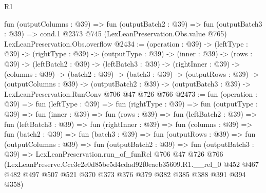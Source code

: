 \begin{lexlean}{R1}
\begin{coremodule}
  fun (outputColumns : @39) =>
  fun (outputBatch2 : @39) =>
  fun (outputBatch3 : @39) =>
  cond.{1} @2373 @745 (LexLeanPreservation.Obs.value @765) LexLeanPreservation.Obs.overflow
@2434 := (operation : @39) ->
  (leftType : @39) ->
  (rightType : @39) ->
  (outputType : @39) ->
  (inner : @39) ->
  (rows : @39) ->
  (leftBatch2 : @39) ->
  (leftBatch3 : @39) ->
  (rightInner : @39) ->
  (columns : @39) ->
  (batch2 : @39) ->
  (batch3 : @39) ->
  (outputRows : @39) ->
  (outputColumns : @39) ->
  (outputBatch2 : @39) -> (outputBatch3 : @39) -> LexLeanPreservation.RunConv @706 @47 @726 @766
@2473 := fun (operation : @39) =>
  fun (leftType : @39) =>
  fun (rightType : @39) =>
  fun (outputType : @39) =>
  fun (inner : @39) =>
  fun (rows : @39) =>
  fun (leftBatch2 : @39) =>
  fun (leftBatch3 : @39) =>
  fun (rightInner : @39) =>
  fun (columns : @39) =>
  fun (batch2 : @39) =>
  fun (batch3 : @39) =>
  fun (outputRows : @39) =>
  fun (outputColumns : @39) =>
  fun (outputBatch2 : @39) =>
  fun (outputBatch3 : @39) =>
  LexLeanPreservation.run_of_funRel
    @706
    @47
    @726
    @766
    (LexLeanPreserve.Ccc3c2e0d85be5d4cdad92f0eaeb35609.R1.__rel_0
      @452
      @467
      @482
      @497
      @507
      @521
      @370
      @373
      @376
      @379
      @382
      @385
      @388
      @391
      @394
      @358)
\end{coremodule}
\end{lexlean}
